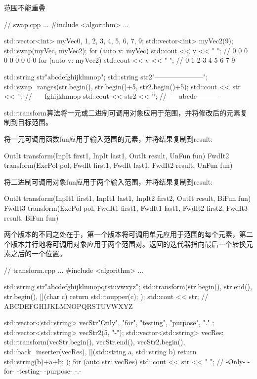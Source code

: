 \begin{myWarning}{范围不能重叠}
	

\begin{cpp}
// swap.cpp
...
#include <algorithm>
...

std::vector<int> myVec{0, 1, 2, 3, 4, 5, 6, 7, 9};
std::vector<int> myVec2(9);
std::swap(myVec, myVec2);
for (auto v: myVec) std::cout << v << " "; // 0 0 0 0 0 0 0 0 0
for (auto v: myVec2) std::cout << v << " "; // 0 1 2 3 4 5 6 7 9

std::string str{"abcdefghijklmnop"};
std::string str2{"---------------------"};
std::swap_ranges(str.begin(), str.begin()+5, str2.begin()+5);
std::cout << str << '\n'; // -----fghijklmnop
std::cout << str2 << '\n'; // -----abcde-----------
\end{cpp}
\end{myWarning}


std::transform算法将一元或二进制可调用对象应用于范围，并将修改后的元素复制到目标范围。

将一元可调用函数fun应用于输入范围的元素，并将结果复制到result:

\begin{cpp}
OutIt transform(InpIt first1, InpIt last1, OutIt result, UnFun fun)
FwdIt2 transform(ExePol pol, FwdIt first1, FwdIt last1, FwdIt2 result, UnFun fun)
\end{cpp}

将二进制可调用对象fun应用于两个输入范围，并将结果复制到result:

\begin{cpp}
OutIt transform(InpIt1 first1, InpIt1 last1, InpIt2 first2, OutIt result,
			    BiFun fun)
FwdIt3 transform(ExePol pol, FwdIt1 first1, FwdIt1 last1,
				 FwdIt2 first2, FwdIt3 result, BiFun fun)
\end{cpp}

两个版本的不同之处在于，第一个版本将可调用单元应用于范围的每个元素，第二个版本并行地将可调用对象应用于两个范围对。返回的迭代器指向最后一个转换元素之后的一个位置。


\begin{cpp}
// transform.cpp
...
#include <algorithm>
...

std::string str{"abcdefghijklmnopqrstuvwxyz"};
std::transform(str.begin(), str.end(), str.begin(),
				[](char c){ return std::toupper(c); });
std::cout << str; // ABCDEFGHIJKLMNOPQRSTUVWXYZ

std::vector<std::string> vecStr{"Only", "for", "testing", "purpose", "." };
std::vector<std::string> vecStr2(5, "-");
std::vector<std::string> vecRes;
std::transform(vecStr.begin(), vecStr.end(),
			   vecStr2.begin(), std::back_inserter(vecRes),
			   [](std::string a, std::string b){ return std::string(b)+a+b; });
for (auto str: vecRes) std::cout << str << " ";
                             // -Only- -for- -testing- -purpose- -.-
\end{cpp}

